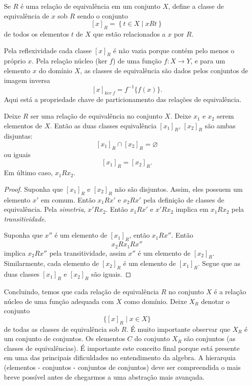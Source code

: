          \begin{definition}
            Se $R$ é uma relação de equivalência em um conjunto $X$, define a classe de equivalência de $x$ sob $R$ sendo o conjunto $$ \left[x\right]_{R} = \left\{t \in X \mid x R t\right\}$$ de todos os elementos $t$ de $X$ que estão relacionados a $x$ por $R$.
         \end{definition}
         Pela reflexividade cada classe $\left[x\right]_{R}$ é não vazia porque contém pelo menos o próprio $x$. Pela relação núcleo (ker $f$) de uma função $f: X\to Y$, e para um elemento $x$ do domínio $X$, as classes de equivalência são dados pelos conjuntos de imagem inversa $$\left[x\right]_{ker\ f} = f^{-1}\{f(x)\}.$$ Aqui está a propriedade chave de particionamento das relações de equivalência.
         \begin{stat}\label{PropLag1}
            Deixe $R$ ser uma relação de equivalência no conjunto $X$. Deixe $x_{1}$ e $x_{2}$ serem elementos de $X$. Então as duas classes equivalência $\left[x_{1}\right]_{R}$, $\left[x_{2}\right]_{R}$ são ambas disjuntas: $$\left[x_{1}\right]_{R} \cap \left[x_{2}\right]_{R} = \varnothing$$ ou iguais $$\left[x_{1}\right]_{R} = \left[x_{2}\right]_{R}.$$ Em último caso, $x_{1} R x_{2}$.
            \begin{proof}
               Suponha que $\left[x_{1}\right]_{R}$ e $\left[x_{2}\right]_{R}$ não são disjuntos. Assim, eles possuem um elemento $x'$ em comum. Então $x_{1} R x'$ e $x_{2} R x'$ pela definição de classes de equivalência. Pela \emph{simetria}, $x' R x_{2}$. Então $x_{1} R x'$ e $x' R x_{2}$ implica em $x_{1} R x_{2}$ pela \emph{transitividade}.

               Suponha que $x''$ é um elemento de $\left[x_{1}\right]_{R}$, então $x_{1} R x''$. Então $$ x_{2} R x_{1} R x''$$ implica $x_{2} R x''$ pela transitividade, assim $x''$ é um elemento de $\left[x_{2}\right]_{R}$. Similarmente, cada elemento de $\left[x_{2}\right]_{R}$ é um elemento de $\left[x_{1}\right]_{R}$. Segue que as duas classes $\left[x_{1}\right]_{R}$ e $\left[x_{2}\right]_{R}$ são iguais.
            \end{proof}
         \end{stat}
         Concluindo, temos que cada relação de equivalência $R$ no conjunto $X$ é a relação núcleo de uma função adequada com $X$ como domínio. Deixe $X_{R}$ denotar o conjunto $$\{\left[x\right]_{R} \mid x \in X\}$$ de todas as classes de equivalência sob $R$. É muito importante observar que $X_{R}$ é um conjunto de conjuntos. Os elementos $C$ do conjunto $X_{R}$ são conjuntos (as classes de equivalências). É importante este conceito final porque está presente em uma das principais dificuldades no entendimento da algebra. A hierarquia (elementos - conjuntos - conjuntos de conjuntos) deve ser compreendida o mais breve possível antes de chegarmos a uma abstração mais avançada.
